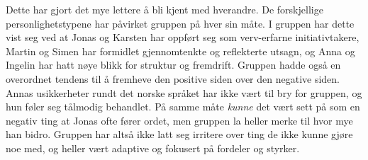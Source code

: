 Dette har gjort det mye lettere å bli kjent med hverandre.
De forskjellige personlighetstypene har påvirket gruppen på hver sin måte.
I gruppen har dette vist seg ved at Jonas og Karsten har oppført seg som verv-erfarne initiativtakere,  Martin og Simen har formidlet gjennomtenkte og reflekterte utsagn, og Anna og Ingelin har hatt nøye blikk for struktur og fremdrift.
Gruppen hadde også en overordnet tendens til å fremheve den positive siden over den negative siden.
Annas usikkerheter rundt det norske språket har ikke vært til bry for gruppen, og hun føler seg tålmodig behandlet.
På samme måte \emph{kunne} det vært sett på som en negativ ting at Jonas ofte fører ordet, men gruppen la heller merke til hvor mye han bidro.
Gruppen har altså ikke latt seg irritere over ting de ikke kunne gjøre noe med, og heller vært adaptive og fokusert på fordeler og styrker.
\\